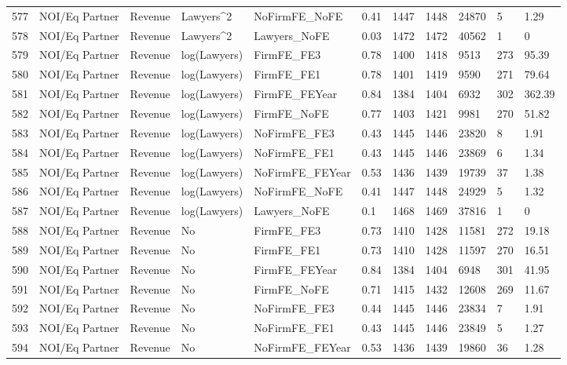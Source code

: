 \begin{table}[ht]
\begin{tabular}{rllllllllll}
  577 & NOI/Eq Partner & Revenue & Lawyers^2 & NoFirmFE\_NoFE & 0.41 & 1447 & 1448 & 24870 & 5 & 1.29 \\ 
  578 & NOI/Eq Partner & Revenue & Lawyers^2 & Lawyers\_NoFE & 0.03 & 1472 & 1472 & 40562 & 1 & 0 \\ 
  579 & NOI/Eq Partner & Revenue & log(Lawyers) & FirmFE\_FE3 & 0.78 & 1400 & 1418 & 9513 & 273 & 95.39 \\ 
  580 & NOI/Eq Partner & Revenue & log(Lawyers) & FirmFE\_FE1 & 0.78 & 1401 & 1419 & 9590 & 271 & 79.64 \\ 
  581 & NOI/Eq Partner & Revenue & log(Lawyers) & FirmFE\_FEYear & 0.84 & 1384 & 1404 & 6932 & 302 & 362.39 \\ 
  582 & NOI/Eq Partner & Revenue & log(Lawyers) & FirmFE\_NoFE & 0.77 & 1403 & 1421 & 9981 & 270 & 51.82 \\ 
  583 & NOI/Eq Partner & Revenue & log(Lawyers) & NoFirmFE\_FE3 & 0.43 & 1445 & 1446 & 23820 & 8 & 1.91 \\ 
  584 & NOI/Eq Partner & Revenue & log(Lawyers) & NoFirmFE\_FE1 & 0.43 & 1445 & 1446 & 23869 & 6 & 1.34 \\ 
  585 & NOI/Eq Partner & Revenue & log(Lawyers) & NoFirmFE\_FEYear & 0.53 & 1436 & 1439 & 19739 & 37 & 1.38 \\ 
  586 & NOI/Eq Partner & Revenue & log(Lawyers) & NoFirmFE\_NoFE & 0.41 & 1447 & 1448 & 24929 & 5 & 1.32 \\ 
  587 & NOI/Eq Partner & Revenue & log(Lawyers) & Lawyers\_NoFE & 0.1 & 1468 & 1469 & 37816 & 1 & 0 \\ 
  588 & NOI/Eq Partner & Revenue & No & FirmFE\_FE3 & 0.73 & 1410 & 1428 & 11581 & 272 & 19.18 \\ 
  589 & NOI/Eq Partner & Revenue & No & FirmFE\_FE1 & 0.73 & 1410 & 1428 & 11597 & 270 & 16.51 \\ 
  590 & NOI/Eq Partner & Revenue & No & FirmFE\_FEYear & 0.84 & 1384 & 1404 & 6948 & 301 & 41.95 \\ 
  591 & NOI/Eq Partner & Revenue & No & FirmFE\_NoFE & 0.71 & 1415 & 1432 & 12608 & 269 & 11.67 \\ 
  592 & NOI/Eq Partner & Revenue & No & NoFirmFE\_FE3 & 0.44 & 1445 & 1446 & 23834 & 7 & 1.91 \\ 
  593 & NOI/Eq Partner & Revenue & No & NoFirmFE\_FE1 & 0.43 & 1445 & 1446 & 23849 & 5 & 1.27 \\ 
  594 & NOI/Eq Partner & Revenue & No & NoFirmFE\_FEYear & 0.53 & 1436 & 1439 & 19860 & 36 & 1.28 \\ 

\end{tabular}
\end{table}
